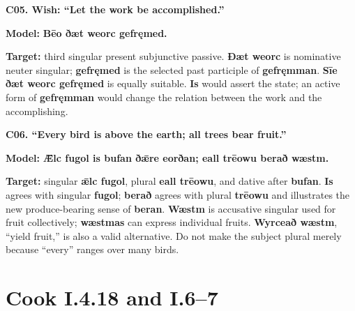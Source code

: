 \par\begin{minipage}{\linewidth}\raggedright
\textbf{C05. Wish: “Let the work be accomplished.”}

\textbf{Model:} \textbf{Bēo ðæt weorc gefręmed.}

\textbf{Target:} third singular present subjunctive passive. \textbf{Ðæt weorc} is nominative neuter singular; \textbf{gefręmed} is the selected past participle of \textbf{gefręmman}. \textbf{Sīe ðæt weorc gefręmed} is equally suitable. \textbf{Is} would assert the state; an active form of \textbf{gefręmman} would change the relation between the work and the accomplishing.

\end{minipage}\par\addvspace{4pt}

\par\begin{minipage}{\linewidth}\raggedright
\textbf{C06. “Every bird is above the earth; all trees bear fruit.”}

\textbf{Model:} \textbf{Ǣlc fugol is bufan ðǣre eorðan; eall trēowu berað wæstm.}

\textbf{Target:} singular \textbf{ǣlc fugol}, plural \textbf{eall trēowu}, and dative after \textbf{bufan}. \textbf{Is} agrees with singular \textbf{fugol}; \textbf{berað} agrees with plural \textbf{trēowu} and illustrates the new produce-bearing sense of \textbf{beran}. \textbf{Wæstm} is accusative singular used for fruit collectively; \textbf{wæstmas} can express individual fruits. \textbf{Wyrceað wæstm}, “yield fruit,” is also a valid alternative. Do not make the subject plural merely because “every” ranges over many birds.

\end{minipage}\par\addvspace{4pt}

\section*{Cook I.4.18 and I.6–7}

